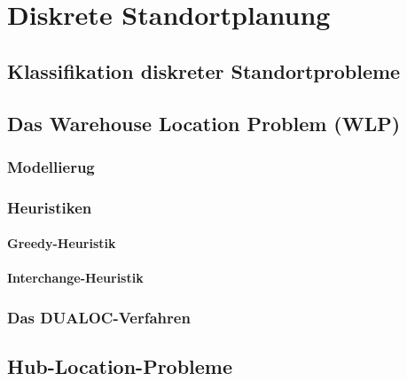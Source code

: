 
\chapter{Diskrete Standortplanung} %
\label{cha:diskrete_standortplanung}

  \section{Klassifikation diskreter Standortprobleme} %
  \label{sec:klassifikation_diskreter_standortprobleme}
  

  \section{Das Warehouse Location Problem (WLP)} %
  \label{sec:das_warehouse_location_problem_}

    \subsection{Modellierug} %
    \label{sub:modellierug}
    

    \subsection{Heuristiken} %
    \label{sub:heuristiken}

      \subsubsection{Greedy-Heuristik}

      \subsubsection{Interchange-Heuristik}


    \subsection{Das DUALOC-Verfahren} %
    \label{sub:das_dualoc_verfahren}
    


  \section{Hub-Location-Probleme} %
  \label{sec:hub_location_probleme}
  

    


